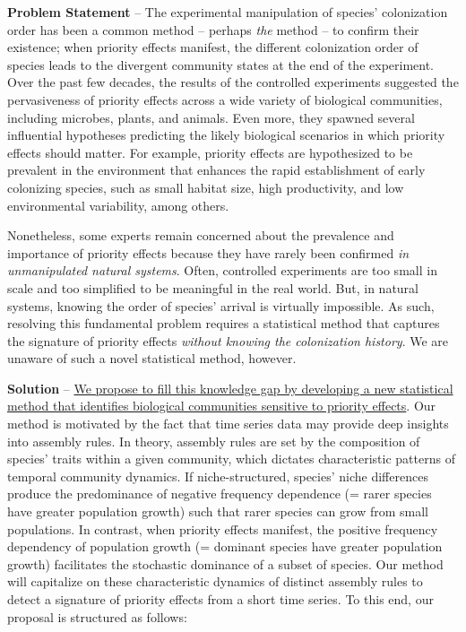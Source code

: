 \documentclass[12pt, class=article, crop=false]{standalone}
\begin{document}
\textbf{Problem Statement} --
The experimental manipulation of species' colonization order has been a common method -- perhaps \textit{the} method -- to confirm their existence; when priority effects manifest, the different colonization order of species leads to the divergent community states at the end of the experiment.
Over the past few decades, the results of the controlled experiments suggested the pervasiveness of priority effects across a wide variety of biological communities, including microbes, plants, and animals.
Even more, they spawned several influential hypotheses predicting the likely biological scenarios in which priority effects should matter.
For example, priority effects are hypothesized to be prevalent in the environment that enhances the rapid establishment of early colonizing species, such as small habitat size, high productivity, and low environmental variability, among others.

Nonetheless, some experts remain concerned about the prevalence and importance of priority effects because they have rarely been confirmed \textit{in unmanipulated natural systems}.
Often, controlled experiments are too small in scale and too simplified to be meaningful in the real world.
But, in natural systems, knowing the order of species' arrival is virtually impossible.
As such, resolving this fundamental problem requires a statistical method that captures the signature of priority effects \textit{without knowing the colonization history}.
We are unaware of such a novel statistical method, however. 

\textbf{Solution} --
\ul{We propose to fill this knowledge gap by developing a new statistical method that identifies biological communities sensitive to priority effects}.
Our method is motivated by the fact that time series data may provide deep insights into assembly rules.
In theory, assembly rules are set by the composition of species' traits within a given community, which dictates characteristic patterns of temporal community dynamics.
If niche-structured, species' niche differences produce the predominance of negative frequency dependence (= rarer species have greater population growth) such that rarer species can grow from small populations.
In contrast, when priority effects manifest, the positive frequency dependency of population growth (= dominant species have greater population growth) facilitates the stochastic dominance of a subset of species.
Our method will capitalize on these characteristic dynamics of distinct assembly rules to detect a signature of priority effects from a short time series.
To this end, our proposal is structured as follows:
\end{document}
